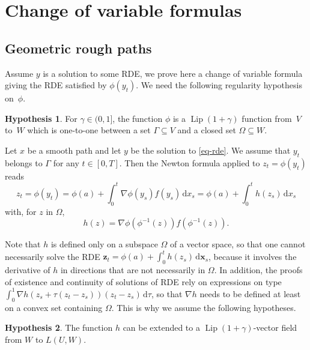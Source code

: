 \documentclass[a4paper,12pt]{article}
\theoremstyle{definition}
\newtheorem{hypothesis}{Hypothesis}
\newcommand{\vd}{\,\mathrm{d}}
\newcommand{\bx}{\mathbf{x}}
\newcommand{\bz}{\mathbf{z}}
\DeclareMathOperator{\Lip}{Lip}
\begin{document}
\section{Change of variable formulas}
\label{sec:change}
\subsection{Geometric rough paths}

Assume $y$ is a solution to some RDE,
we prove here a change of variable formula giving the RDE satisfied by $\phi(y_t)$. We need the following 
regularity hypothesis on~$\phi$.

\begin{hypothesis}
\label{hyp-2}
For $\gamma\in(0,1]$, 
the function $\phi$ is a $\Lip(1+\gamma)$ function from~$V$ to~$W$ 
which is one-to-one between a set $\Gamma\subseteq V$ and a closed set $\Omega\subseteq W$.
\end{hypothesis}

Let $x$ be a smooth path and let $y$ be the solution to \eqref{eq-rde}. 
We assume that $y_t$ belongs to $\Gamma$ for any $t\in[0,T]$.
Then the Newton formula applied to $z_t=\phi(y_t)$ reads
\begin{equation*}
z_t=\phi(y_t)=\phi(a)+\int_0^t \nabla \phi(y_s)f(y_s)\vd x_s
=\phi(a)+\int_0^t  h(z_s)\vd x_s
\end{equation*} 
with, for $z$ in $\Omega$, 
\begin{equation}
\label{eq-14}
h(z)=\nabla \phi(\phi^{-1}(z))f(\phi^{-1}(z)).
\end{equation}

Note that $h$ is defined only on a subspace $\Omega$ of 
a vector space, so that one cannot necessarily 
solve the RDE $\bz_t=\phi(a)+\int_0^t h(z_s)\vd \bx_s$, 
because it involves the derivative of $h$ in directions
that are not necessarily in $\Omega$. In addition, the proofs of existence and 
continuity of solutions of RDE rely on expressions on type
$\int_0^1 \nabla h(z_s+\tau(z_t-z_s))(z_t-z_s)\vd \tau$,
so that $\nabla h$ needs to be defined at least on a convex set containing $\Omega$.
This is why we assume
the following hypotheses.

\begin{hypothesis}
\label{hyp-1}
The function $h$ can be extended to a $\Lip(1+\gamma)$-vector field from $W$ to $L(U,W)$.
\end{hypothesis}
\end{document}
